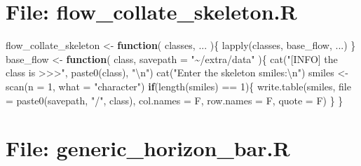 \documentclass[
]{article}
\newenvironment{Shaded}{\begin{snugshade}}{\end{snugshade}}
\newcommand{\AttributeTok}[1]{\textcolor[rgb]{0.77,0.63,0.00}{#1}}
\newcommand{\ControlFlowTok}[1]{\textcolor[rgb]{0.13,0.29,0.53}{\textbf{#1}}}
\newcommand{\DecValTok}[1]{\textcolor[rgb]{0.00,0.00,0.81}{#1}}
\newcommand{\FunctionTok}[1]{\textcolor[rgb]{0.00,0.00,0.00}{#1}}
\newcommand{\NormalTok}[1]{#1}
\newcommand{\OtherTok}[1]{\textcolor[rgb]{0.56,0.35,0.01}{#1}}
\newcommand{\SpecialCharTok}[1]{\textcolor[rgb]{0.00,0.00,0.00}{#1}}
\newcommand{\StringTok}[1]{\textcolor[rgb]{0.31,0.60,0.02}{#1}}
\begin{document}
\hypertarget{file-flow_collate_skeleton.r}{%
\section{File: flow\_collate\_skeleton.R}\label{file-flow_collate_skeleton.r}}

\begin{Shaded}
\begin{Highlighting}[]
\NormalTok{flow\_collate\_skeleton }\OtherTok{\textless{}{-}} 
  \ControlFlowTok{function}\NormalTok{(}
\NormalTok{           classes,}
\NormalTok{           ...}
\NormalTok{           )\{}
    \FunctionTok{lapply}\NormalTok{(classes, base\_flow, ...)}
\NormalTok{  \}}
\NormalTok{base\_flow }\OtherTok{\textless{}{-}}
  \ControlFlowTok{function}\NormalTok{(}
\NormalTok{           class,}
           \AttributeTok{savepath =} \StringTok{"\textasciitilde{}/extra/data"}
\NormalTok{           )\{}
    \FunctionTok{cat}\NormalTok{(}\StringTok{"[INFO] the class is \textgreater{}\textgreater{}\textgreater{}"}\NormalTok{, }\FunctionTok{paste0}\NormalTok{(class), }\StringTok{"}\SpecialCharTok{\textbackslash{}n}\StringTok{"}\NormalTok{)}
    \FunctionTok{cat}\NormalTok{(}\StringTok{"Enter the skeleton smiles:}\SpecialCharTok{\textbackslash{}n}\StringTok{"}\NormalTok{)}
\NormalTok{    smiles }\OtherTok{\textless{}{-}} \FunctionTok{scan}\NormalTok{(}\AttributeTok{n =} \DecValTok{1}\NormalTok{, }\AttributeTok{what =} \StringTok{"character"}\NormalTok{)}
    \ControlFlowTok{if}\NormalTok{(}\FunctionTok{length}\NormalTok{(smiles) }\SpecialCharTok{==} \DecValTok{1}\NormalTok{)\{}
      \FunctionTok{write.table}\NormalTok{(smiles, }\AttributeTok{file =} \FunctionTok{paste0}\NormalTok{(savepath, }\StringTok{"/"}\NormalTok{, class),}
                  \AttributeTok{col.names =}\NormalTok{ F, }\AttributeTok{row.names =}\NormalTok{ F, }\AttributeTok{quote =}\NormalTok{ F)}
\NormalTok{    \}}
\NormalTok{  \}}
\end{Highlighting}
\end{Shaded}

\hypertarget{file-generic_horizon_bar.r}{%
\section{File: generic\_horizon\_bar.R}\label{file-generic_horizon_bar.r}}
\end{document}

